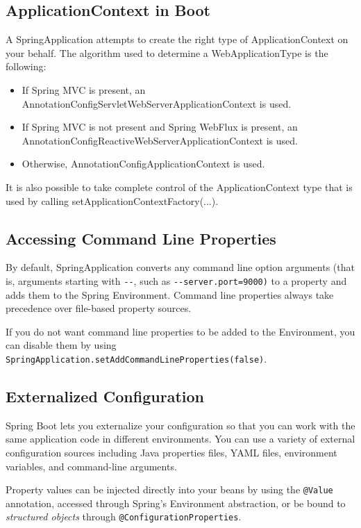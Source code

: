 \documentclass{scrartcl}
\begin{document}
\subsection{ApplicationContext in Boot}

A SpringApplication attempts to create the right type of ApplicationContext on your behalf. The algorithm used to determine a WebApplicationType is the following:

\begin{itemize}
    \item If Spring MVC is present, an AnnotationConfigServletWebServerApplicationContext is used.
    \item If Spring MVC is not present and Spring WebFlux is present, an AnnotationConfigReactiveWebServerApplicationContext is used.
    \item Otherwise, AnnotationConfigApplicationContext is used.
\end{itemize}

It is also possible to take complete control of the ApplicationContext type that is used by calling setApplicationContextFactory(...).

\subsection{Accessing Command Line Properties}

By default, SpringApplication converts any command line option arguments (that is, arguments
starting with \lstinline|--|, such as \lstinline|--server.port=9000)| to a property and adds them to the Spring Environment.
Command line properties always take precedence over file-based
property sources.

If you do not want command line properties to be added to the Environment, you can disable them
by using \lstinline|SpringApplication.setAddCommandLineProperties(false)|.

\subsection{Externalized Configuration}

Spring Boot lets you externalize your configuration so that you can work with the same application code in different environments. You can use a variety of external configuration sources including Java properties files, YAML files, environment variables, and command-line arguments.

Property values can be injected directly into your beans by using the \lstinline |@Value| annotation, accessed through Spring’s Environment abstraction, or be bound to \textit{structured objects} through \lstinline[]|@ConfigurationProperties|.
\end{document}
